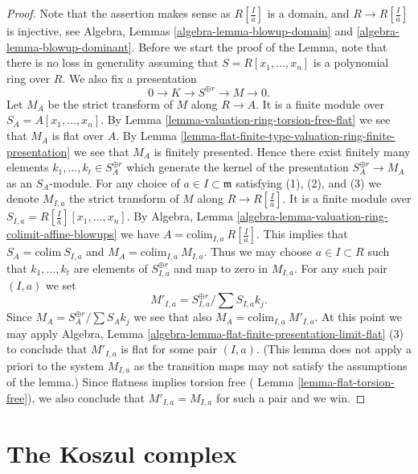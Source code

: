 \begin{proof}
Note that the assertion makes sense as $R[\frac{I}{a}]$
is a domain, and $R \to R[\frac{I}{a}]$ is injective, see
Algebra, Lemmas \ref{algebra-lemma-blowup-domain} and
\ref{algebra-lemma-blowup-dominant}.
Before we start the proof of the Lemma, note that there is
no loss in generality assuming that $S = R[x_1, \ldots, x_n]$
is a polynomial ring over $R$. We also fix a presentation
$$
0 \to K \to S^{\oplus r} \to M \to 0.
$$
Let $M_A$ be the strict transform of $M$ along $R \to A$. It is a finite
module over $S_A = A[x_1, \ldots, x_n]$. By
Lemma \ref{lemma-valuation-ring-torsion-free-flat}
we see that $M_A$ is flat over $A$. By
Lemma \ref{lemma-flat-finite-type-valuation-ring-finite-presentation}
we see that $M_A$ is finitely presented. Hence there exist finitely many
elements $k_1, \ldots, k_t \in S_A^{\oplus r}$ which generate the
kernel of the presentation $S_A^{\oplus r} \to M_A$ as
an $S_A$-module. For any choice of $a \in I \subset \mathfrak m$
satisfying (1), (2), and (3) we denote $M_{I, a}$ the strict transform of
$M$ along $R \to R[\frac{I}{a}]$. It is a finite module over
$S_{I, a} = R[\frac{I}{a}][x_1, \ldots, x_n]$. By
Algebra, Lemma \ref{algebra-lemma-valuation-ring-colimit-affine-blowups}
we have $A = \text{colim}_{I, a}\ R[\frac{I}{a}]$.
This implies that $S_A = \text{colim}\ S_{I, a}$ and
$M_A = \text{colim}_{I, a}\ M_{I, a}$.
Thus we may choose $a \in I \subset R$ such that
$k_1, \ldots, k_t$ are elements of $S_{I, a}^{\oplus r}$ and
map to zero in $M_{I, a}$. For any such pair $(I, a)$ we set
$$
M'_{I, a} = S_{I, a}^{\oplus r}/ \sum S_{I, a}k_j.
$$
Since $M_A = S_A^{\oplus r}/ \sum S_Ak_j$ we see that also
$M_A = \text{colim}_{I, a}\ M'_{I, a}$.
At this point we may apply
Algebra, Lemma \ref{algebra-lemma-flat-finite-presentation-limit-flat} (3)
to conclude that $M'_{I, a}$ is flat for some pair $(I, a)$.
(This lemma does not apply a priori to the system $M_{I, a}$
as the transition maps may not satisfy the assumptions of the lemma.)
Since flatness implies torsion free (
Lemma \ref{lemma-flat-torsion-free}),
we also conclude that $M'_{I, a} = M_{I, a}$ for such a pair and we win.
\end{proof}







\section{The Koszul complex}
\label{section-koszul}

